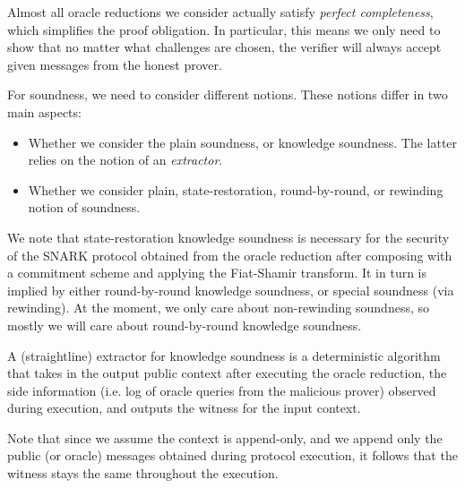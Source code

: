 \begin{definition}[Completeness]
    \label{def:completeness}
\end{definition}

Almost all oracle reductions we consider actually satisfy \emph{perfect completeness}, which
simplifies the proof obligation. In particular, this means we only need to show that no matter what challenges are chosen, the verifier will always accept given messages from the honest prover.

For soundness, we need to consider different notions. These notions differ in two main aspects:
\begin{itemize}
    \item Whether we consider the plain soundness, or knowledge soundness. The latter relies on the
    notion of an \emph{extractor}.
    \item Whether we consider plain, state-restoration, round-by-round, or rewinding notion of
    soundness.
\end{itemize}

We note that state-restoration knowledge soundness is necessary for the security of the SNARK
protocol obtained from the oracle reduction after composing with a commitment scheme and applying
the Fiat-Shamir transform. It in turn is implied by either round-by-round knowledge soundness, or
special soundness (via rewinding). At the moment, we only care about non-rewinding soundness, so mostly we will care about round-by-round knowledge soundness.

\begin{definition}[Soundness]
    \label{def:soundness}
\end{definition}

A (straightline) extractor for knowledge soundness is a deterministic algorithm that takes in the output public context after executing the oracle reduction, the side information (i.e. log of oracle queries from the malicious prover) observed during execution, and outputs the witness for the input context.

Note that since we assume the context is append-only, and we append only the public (or oracle)
messages obtained during protocol execution, it follows that the witness stays the same throughout
the execution.

\begin{definition}
    \label{def:knowledge_soundness}
\end{definition}

